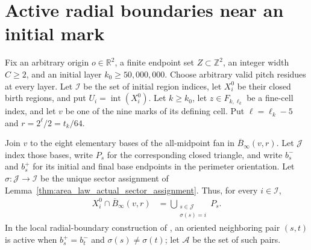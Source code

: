 \section{Active radial boundaries near an initial mark}
\label{sec:area_law_initial_active_rays}

Fix an arbitrary origin $o\in\mathbb R^2$, a finite endpoint set
$Z\subset\mathbb Z^2$, an integer width $C\ge2$, and an initial layer
$k_0\ge50{,}000{,}000$. Choose arbitrary valid pitch residues at every
layer. Let $\mathcal I$ be the set of initial region indices, let $X_i^0$
be their closed birth regions, and put $U_i=\operatorname{int}(X_i^0)$.
Let $k\ge k_0$, let $z\in F_{k,\ell_k}$ be a fine-cell index,
and let $v$ be one of the nine marks of its defining cell.
Put $\ell=\ell_k-5$ and $r=2^\ell/2=t_k/64$.

Join $v$ to the eight elementary bases of the all-midpoint fan in
$\overline B_\infty(v,r)$. Let $\mathcal J$ index those bases, write
$P_s$ for the corresponding closed triangle, and write $b_s^-$ and
$b_s^+$ for its initial and final base endpoints in the perimeter
orientation. Let $\sigma:\mathcal J\to\mathcal I$ be the unique sector
assignment of Lemma~\ref{thm:area_law_actual_sector_assignment}.
Thus, for every $i\in\mathcal I$,
\begin{align}
    X_i^0\cap\overline B_\infty(v,r)
     & =\bigcup_{\substack{s\in\mathcal J \\\sigma(s)=i}}P_s.
    \label{eq:active_radial_decomposition}
\end{align}
In the local radial-boundary construction of
\cite[Section~11]{OpenAI2026AreaLaw}, an oriented neighboring pair $(s,t)$ is active when
$b_s^+=b_t^-$ and $\sigma(s)\ne\sigma(t)$; let $\mathcal A$ be the set of such pairs.


